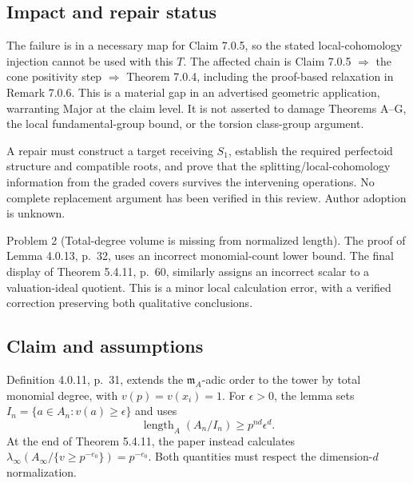 \documentclass[10pt]{article}
\begin{document}
\subsection*{Impact and repair status}
The failure is in a necessary map for Claim 7.0.5, so the stated local-cohomology injection cannot be used with this \(T\). The affected chain is Claim 7.0.5 \(\Rightarrow\) the cone positivity step \(\Rightarrow\) Theorem 7.0.4, including the proof-based relaxation in Remark 7.0.6. This is a material gap in an advertised geometric application, warranting Major at the claim level. It is not asserted to damage Theorems A–G, the local fundamental-group bound, or the torsion class-group argument.\par
A repair must construct a target receiving \(S_1\), establish the required perfectoid structure and compatible roots, and prove that the splitting/local-cohomology information from the graded covers survives the intervening operations. No complete replacement argument has been verified in this review. Author adoption is unknown.\par
Problem 2 (Total-degree volume is missing from normalized length).  The proof of Lemma 4.0.13, p. 32, uses an incorrect monomial-count lower bound. The final display of Theorem 5.4.11, p. 60, similarly assigns an incorrect scalar to a valuation-ideal quotient. This is a minor local calculation error, with a verified correction preserving both qualitative conclusions.\par
\subsection*{Claim and assumptions}
Definition 4.0.11, p. 31, extends the \(\mathfrak m_A\)-adic order to the tower by total monomial degree, with \(v(p)=v(x_i)=1\). For \(\epsilon>0\), the lemma sets \(I_n=\{a\in A_n:v(a)\geq\epsilon\}\) and uses \[\operatorname{length}_A(A_n/I_n)\geq p^{nd}\epsilon^d.\] At the end of Theorem 5.4.11, the paper instead calculates \(\lambda_\infty(A_\infty/\{v\geq p^{-e_0}\})=p^{-e_0}\). Both quantities must respect the dimension-\(d\) normalization.\par
\end{document}
